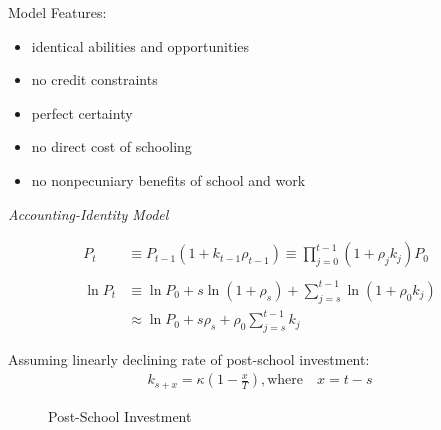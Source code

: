 \begin{frame}
Model Features:
\begin{itemize}
\item identical abilities and opportunities
\item no credit constraints
\item perfect certainty
\item no direct cost of schooling
\item no nonpecuniary benefits of school and work
\end{itemize}
\end{frame}

\begin{frame}\begin{center}
\LARGE\textit{Accounting-Identity Model}
\end{center}\end{frame}

\begin{frame}
\begin{align*}
P_t & \equiv P_{t - 1} (1 + k_{t - 1} \rho_{t - 1}) \equiv \prod^{t - 1}_{j= 0} (1 + \rho_jk_j)P_0 \\
& \\
\ln P_t & \equiv \ln P_0  + s \ln(1 + \rho_s) + \sum^{t -1}_{j=s} \ln(1 + \rho_0 k_j) \\
& \approx  \ln P_0 + s \rho_s + \rho_0 \sum^{t - 1}_{j=s} k_j
\end{align*}
\end{frame}



\begin{frame}
Assuming linearly declining rate of post-school investment:
\begin{align*}
k_{s + x} = \kappa\left( 1 - \frac{x}{T}\right),\text{where} \quad x = t - s
\end{align*}
\end{frame}

\begin{frame}
\begin{figure}[htp]\centering
\caption{Post-School Investment}\label{Post-School Investment}
\end{figure}
\end{frame}

